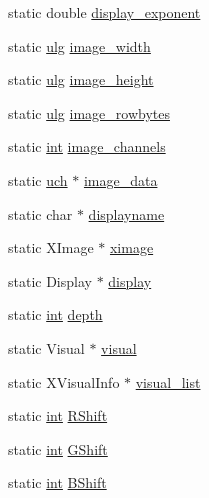 \begin{DoxyCompactItemize}
static double \mbox{\hyperlink{rpng-x_8c_ad738f63cfb0d9f52281786250bd91ceb}{display\+\_\+exponent}}
\item 
static \mbox{\hyperlink{readpng_8h_abd6f60bf9450af2ecb94097a32c19a64}{ulg}} \mbox{\hyperlink{rpng-x_8c_a3b6cf9cbad0cab3d7487c4b95eccf670}{image\+\_\+width}}
\item 
static \mbox{\hyperlink{readpng_8h_abd6f60bf9450af2ecb94097a32c19a64}{ulg}} \mbox{\hyperlink{rpng-x_8c_a1bd99dc918f6e33880e71043b4ba3c38}{image\+\_\+height}}
\item 
static \mbox{\hyperlink{readpng_8h_abd6f60bf9450af2ecb94097a32c19a64}{ulg}} \mbox{\hyperlink{rpng-x_8c_a140cae2e235228abcc51d57a6d6484d3}{image\+\_\+rowbytes}}
\item 
static \mbox{\hyperlink{ioapi_8h_a787fa3cf048117ba7123753c1e74fcd6}{int}} \mbox{\hyperlink{rpng-x_8c_a11c512948875a4297d4b6fbac58d4594}{image\+\_\+channels}}
\item 
static \mbox{\hyperlink{readpng_8h_af3307af5922c72924a837559c801a8a4}{uch}} $\ast$ \mbox{\hyperlink{rpng-x_8c_ab11e4eabc5bd13b2fee5b43afa28cd64}{image\+\_\+data}}
\item 
static char $\ast$ \mbox{\hyperlink{rpng-x_8c_a50689dac041ace6e96378e3f30ca5cc4}{displayname}}
\item 
static X\+Image $\ast$ \mbox{\hyperlink{rpng-x_8c_a49ce7b9b4d558b607f8ad1854599fde2}{ximage}}
\item 
static Display $\ast$ \mbox{\hyperlink{rpng-x_8c_a854f9eb314f72feecf68ba03c6f0e5d5}{display}}
\item 
static \mbox{\hyperlink{ioapi_8h_a787fa3cf048117ba7123753c1e74fcd6}{int}} \mbox{\hyperlink{rpng-x_8c_acb5ba97551079e0b072c62c21d784ac5}{depth}}
\item 
static Visual $\ast$ \mbox{\hyperlink{rpng-x_8c_a6ff21403d498574a0185ea2e360e66e9}{visual}}
\item 
static X\+Visual\+Info $\ast$ \mbox{\hyperlink{rpng-x_8c_a60185eb73e2607b97ece59bd1ef958a1}{visual\+\_\+list}}
\item 
static \mbox{\hyperlink{ioapi_8h_a787fa3cf048117ba7123753c1e74fcd6}{int}} \mbox{\hyperlink{rpng-x_8c_a749e9e93860b1af042087034eea7684c}{R\+Shift}}
\item 
static \mbox{\hyperlink{ioapi_8h_a787fa3cf048117ba7123753c1e74fcd6}{int}} \mbox{\hyperlink{rpng-x_8c_aab8970c588e523b349cc24466aacfdb7}{G\+Shift}}
\item 
static \mbox{\hyperlink{ioapi_8h_a787fa3cf048117ba7123753c1e74fcd6}{int}} \mbox{\hyperlink{rpng-x_8c_a4ebd97c21166f35b46ac4d4409ee3edf}{B\+Shift}}

\end{DoxyCompactItemize}
